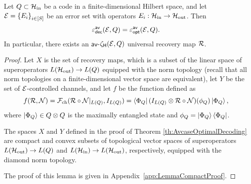 \documentclass[10pt]{article}
\newcommand{\SIN}{\mathrm{in}}
\newcommand{\SOUT}{\mathrm{out}}
\newcommand{\ppp}[1]{\left\{#1\right\}}
\newcommand{\s}[1]{\mathsf{#1}}
\begin{document}
\begin{theorem}\label{th:AvcaseOptimalDecoding}
     Let $Q\subset \calH_{\SIN}$ be a code in a finite-dimensional Hilbert space, and let $\calE=\ppp{E_i}_{i\in [S]}$ be an error set with operators $E_i:\calH_{\SIN}\to\calH_{\SOUT}$. Then  \[\varepsilon_{\s{dec}}^{\s{av}}(\calE,Q)= \varepsilon_{\s{opt}}^{\s{av}}(\calE,Q).\] 
     In particular, there exists an $\s{av}$-$\zeta_{\s{H}}(\calE,Q)$ universal recovery map ${\cal R}$. 
\end{theorem}

\begin{proof}
Let $X$ is the set of recovery maps, which is a subset of the linear space of superoperators $L(\calH_{\SOUT})\to L(Q)$ equipped with the norm topology (recall that all norm topologies on a finite-dimensional vector space are equivalent), let $Y$ be the set of ${\cal E}$-controlled channels, and let $f$ be the function defined as
    \[f({\cal R},{\cal N})={\cal F}_{\mathrm{ch}}(  {\cal R}\circ{\cal N}|_{L(Q)},I_{L(Q)})=\bra{\Phi_Q} (I_{L(Q)}\otimes {\cal R}\circ {\cal N}) (\phi_Q) \ket{\Phi_{Q}}, \]
    where $\ket{\Phi_Q}\in Q\otimes Q$ is the maximally entangled state and $\phi_Q=\ket{\Phi_Q}\bra{\Phi_Q}$. 

    \begin{lemma}\label{lem:CompactEcontrolled}
 The spaces $X$ and $Y$ defined in the proof of Theorem \ref{th:AvcaseOptimalDecoding} are compact and convex subsets of topological vector spaces of superoperators $L(\calH_{\SOUT})\to L(Q)$ and $L(\calH_{\SIN})\to L(\calH_{\SOUT})$, respectively, equipped with the diamond norm topology.
    \end{lemma}
The proof of this lemma is given in Appendix~\ref{app:LemmaCompactProof}.  


\end{proof}
\end{document}
